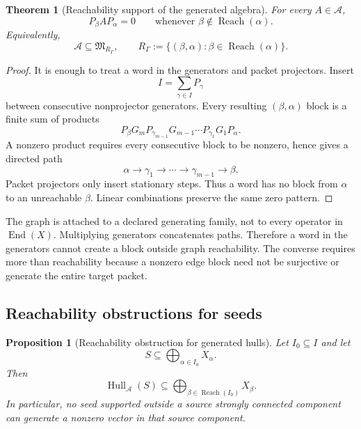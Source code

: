 \documentclass[11pt]{article}
\newtheorem{theorem}{Theorem}[section]
\newtheorem{proposition}[proposition]{Proposition}
\theoremstyle{definition}
\theoremstyle{remark}
\theoremstyle{definition}\newtheorem{example}[theorem]{Example}
\newcommand{\A}{\mathcal A}
\newcommand{\Hull}{\operatorname{Hull}}
\newcommand{\End}{\operatorname{End}}
\newcommand{\Reach}{\operatorname{Reach}}
\newcommand{\RecordID}[1]{\label{record:#1}}
\newcommand{\Depends}[1]{}
\begin{document}
\begin{theorem}[Reachability support of the generated algebra]
\label{thm:algebra-reachability-support}
For every $A\in\A$,
\[
P_\beta AP_\alpha=0
\qquad\text{whenever }\beta\notin\Reach(\alpha).
\]
Equivalently,
\[
\A\subseteq\mathfrak M_{R_\Gamma},
\qquad
R_\Gamma:=\{(\beta,\alpha):\beta\in\Reach(\alpha)\}.
\]
\end{theorem}
\RecordID{PSC-I-T-ALGEBRA-REACHABILITY-SUPPORT}
\Depends{PSC-I-D-TRANSFER-GRAPH and PSC-I-C-BLOCK-POWERS.}

\begin{proof}
It is enough to treat a word in the generators and packet projectors.  Insert
\[
I=\sum_{\gamma\in I}P_\gamma
\]
between consecutive nonprojector generators.  Every resulting $(\beta,\alpha)$ block is a finite sum of products
\[
P_\beta G_mP_{\gamma_{m-1}}
G_{m-1}\cdots
P_{\gamma_1}G_1P_\alpha.
\]
A nonzero product requires every consecutive block to be nonzero, hence gives a directed path
\[
\alpha\to\gamma_1\to\cdots\to\gamma_{m-1}\to\beta.
\]
Packet projectors only insert stationary steps.  Thus a word has no block from $\alpha$ to an unreachable $\beta$.  Linear combinations preserve the same zero pattern.
\end{proof}

\begin{interpretation}
The graph is attached to a declared generating family, not to every operator in \(\End(X)\).  Multiplying generators concatenates paths.  Therefore a word in the generators cannot create a block outside graph reachability.  The converse requires more than reachability because a nonzero edge block need not be surjective or generate the entire target packet.
\end{interpretation}


\subsection{Reachability obstructions for seeds}
\begin{proposition}[Reachability obstruction for generated hulls]
\label{prop:reachability-obstruction}
Let $I_0\subseteq I$ and let
\[
S\subseteq\bigoplus_{\alpha\in I_0}X_\alpha.
\]
Then
\[
\boxed{
\Hull_{\A}(S)
\subseteq
\bigoplus_{\beta\in\Reach(I_0)}X_\beta.
}
\]
In particular, no seed supported outside a source strongly connected component can generate a nonzero vector in that source component.
\end{proposition}
\RecordID{PSC-I-P-REACHABILITY-OBSTRUCTION}
\Depends{PSC-I-T-ALGEBRA-REACHABILITY-SUPPORT.}
\end{document}
